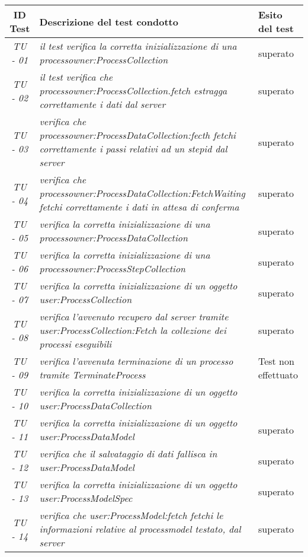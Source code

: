 \begin{small}\centering
\begin{tabular}{|c|p{8.0cm}|p{2.0cm}|}
\hline
\textbf{ID Test} & \textbf{Descrizione del test condotto} & \textbf{Esito del test} \\
\hline
\textit{TU - 01} &
\textit{il test verifica la corretta inizializzazione di una processowner:ProcessCollection} & superato \\
\hline
\textit{TU - 02} &
\textit{il test verifica che  processowner:ProcessCollection.fetch estragga correttamente i dati dal server } & superato \\
\hline
\textit{TU - 03} & 
\textit{verifica che processowner:ProcessDataCollection:fecth fetchi correttamente i passi relativi ad un stepid dal server} & superato  \\
\hline
\textit{TU - 04} &
\textit{verifica che processowner:ProcessDataCollection:FetchWaiting fetchi correttamente i dati in attesa di conferma} & superato  \\
\hline
\textit{TU - 05} &
\textit{verifica la corretta inizializzazione di una processowner:ProcessDataCollection } & superato \\
\hline
\textit{TU - 06} &
\textit{verifica la corretta inizializzazione di una processowner:ProcessStepCollection} & superato  \\
\hline
\textit{TU - 07} &
\textit{verifica la corretta inizializzazione di un oggetto user:ProcessCollection} &  superato\\
\hline
\textit{TU - 08} &
\textit{verifica l'avvenuto recupero dal server tramite user:ProcessCollection:Fetch la collezione dei processi eseguibili} & superato \\
\hline
\textit{TU - 09} &
\textit{verifica l'avvenuta terminazione di un processo tramite TerminateProcess} & Test non effettuato \\
\hline
\textit{TU - 10} &
\textit{verifica la corretta inizializzazione di un oggetto user:ProcessDataCollection} &  \\
\hline
\textit{TU - 11} &
\textit{verifica la corretta inizializzazione di un oggetto user:ProcessDataModel} & superato \\
\hline
\textit{TU - 12} &
\textit{verifica che il salvataggio di dati fallisca in user:ProcessDataModel} & superato \\
\hline
\textit{TU - 13} &
\textit{verifica la corretta inizializzazione di un oggetto user:ProcessModelSpec} & superato \\
\hline
\textit{TU - 14} &
\textit{verifica che user:ProcessModel:fetch fetchi le informazioni relative al processmodel testato, dal server} & superato \\
\hline
\end{tabular}\\
\end{small}

